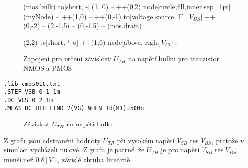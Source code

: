 \begin{figure}[H]
\begin{minipage}{0.5\textwidth}
\begin{circuitikz}[scale=1, transform shape]
              
              (mos.bulk) to[short, -] (1, 0) -- ++(0,2) node[circle,fill,inner sep=1pt] (myNode) {} -- ++(1,0) -- ++(0,-1) to[voltage source, l^=$V_{DS} $] ++(0,-2) -- (2,-1.5) -- (0,-1.5) -- (mos.drain)

              (2,2)  to[short, *-o] ++(1,0) node[above, right]{$V_{CC}$}
            ;
        \end{circuitikz}

        \vspace{5mm} 
    \end{minipage}
    \caption{\label{cod:cod_NP_WL_const} Zapojení pro určení závislosti \(U_{TH}\) na napětí bulku pro tranzistor NMOS a PMOS}
\end{figure}

\begin{lstlisting}[language=Spice, caption={Kod simulace pro určení závislosti \(U_{TH}\) na napětí bulku}]
.lib cmos018.txt
.STEP VSB 0 1 1m
.DC VGS 0 2 1m
.MEAS DC UTH FIND V(VG) WHEN Id(M1)=500n
\end{lstlisting}

\begin{figure}[H]
    \centering
    \caption{Závislost \(U_{TH}\) na napětí bulku}
    \label{fig:bulkEfekt}
\end{figure}
Z grafu jsou odstraněni hodnoty \(U_{TH}\) při vysokém napětí \(V_{SB}\) res \(V_{BS}\), protože v simulaci vycházeli nulové.
Z grafu je patrné, že \(U_{TH}\) je pro napětí \(V_{SB}\) res \(V_{BS}\) menší než \(0.8 [V]\), závislé zhruba lineárně.


